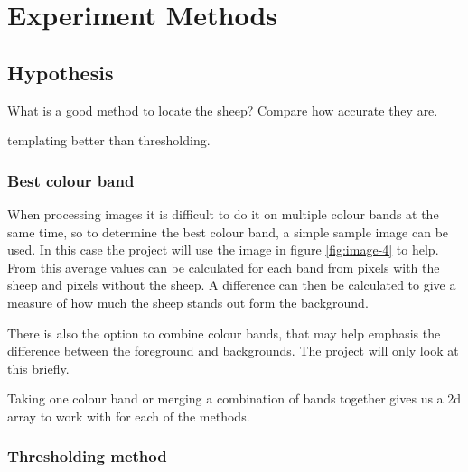\chapter{Experiment Methods}
\begin{comment}
This section should discuss the overall hypothesis being tested and justify the approach selected in the context of the research area.  Describe the experiment design that has been selected and how measurements and comparisons of results are to be made. 

You should concentrate on the more important aspects of the method. Present an overview before going into detail. As well as describing the methods adopted, discuss other approaches that were considered. You might also discuss areas that you had to revise after some investigation. 


\end{comment}

\section{Hypothesis}

What is a good method to locate the sheep?
Compare how accurate they are.

templating better than thresholding.

\subsection{Best colour band}
When processing images it is difficult to do it on multiple colour bands at the same time, so to determine the best colour band, a simple sample image can be used. In this case the project will use the image in figure \ref{fig:image-4} to help. From this average values can be calculated for each band from pixels with the sheep and pixels without the sheep. A difference can then be calculated to give a measure of how much the sheep stands out form the background.

There is also the option to combine colour bands, that may help emphasis the difference between the foreground and backgrounds. The project will only look at this briefly.

Taking one colour band or merging a combination of bands together gives us a 2d array to work with for each of the methods.

\subsection{Thresholding method}

